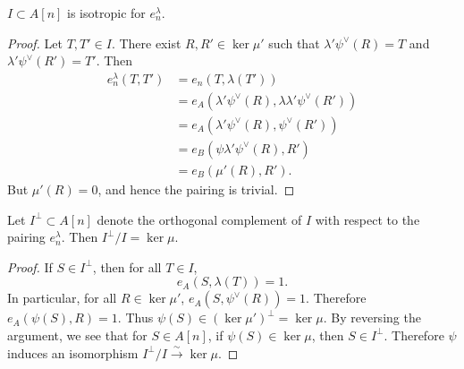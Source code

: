 \documentclass{amsart}
\begin{document}
\begin{lemma}\label{lemma:I-isotropic}
  $I \subset A[n]$ is isotropic for $e_n^\lambda$.
\end{lemma}

\begin{proof}
  Let $T, T' \in I$. There exist $R,R' \in \ker \mu'$ such that $\lambda'\psi^\vee(R) = T$ and $\lambda'\psi^\vee(R') = T'$. Then
  \begin{align*}
    e_n^\lambda(T,T') &= e_n(T, \lambda(T')) \\
                    &= e_A(\lambda'\psi^\vee(R), \lambda\lambda'\psi^\vee(R')) \\
                    &= e_A(\lambda'\psi^\vee(R), \psi^\vee(R')) \\
                    &= e_B(\psi\lambda'\psi^\vee(R), R') \\
                    &= e_B(\mu'(R), R').
  \end{align*}
  But $\mu'(R) = 0$, and hence the pairing is trivial.
\end{proof}

\begin{lemma}\label{lemma:Iperp-modI-ker-mu}
  Let $I^\perp \subset A[n]$ denote the orthogonal complement of $I$ with respect to the pairing $e_n^\lambda$. Then $I^\perp/I = \ker \mu$.
\end{lemma}

\begin{proof}
  If $S \in I^\perp$, then for all $T \in I$,
  \[
    e_A(S, \lambda(T)) = 1.
  \]
  In particular, for all $R \in \ker \mu'$, $e_A(S, \psi^\vee(R)) = 1$. Therefore $e_A(\psi(S), R) = 1$. Thus $\psi(S) \in (\ker \mu')^\perp = \ker \mu$. By reversing the argument, we see that for $S \in A[n]$, if $\psi(S) \in \ker \mu$, then $S \in I^\perp$. Therefore $\psi$ induces an isomorphism $I^\perp/I \xrightarrow{\sim} \ker \mu$.
\end{proof}

\end{document}
